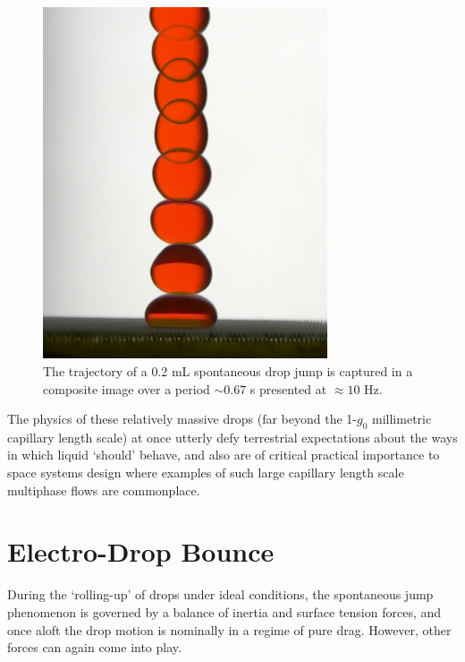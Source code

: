 \documentclass[12pt,a4paper,oneside]{book}
\begin{document}
\begin{figure}[htb]
\centering
\includegraphics[width=0.75\textwidth]{drop_jump}
\caption{The trajectory of a 0.2 mL spontaneous drop jump is captured in a composite image over a period $\sim 0.67$ s presented at $\approx 10$ Hz. \label{fig:nobounce}}
\end{figure}

The physics of these relatively massive drops (far beyond the 1-$g_0$ millimetric capillary length scale) at once utterly defy terrestrial expectations about the ways in which liquid `should' behave, and also are of critical practical importance to space systems design where examples of such large capillary length scale multiphase flows are commonplace.

\section{Electro-Drop Bounce}
During the `rolling-up' of drops under ideal conditions, the spontaneous jump phenomenon is governed by a balance of inertia and surface tension forces, and once aloft the drop motion is nominally in a regime of pure drag. However, other forces can again come into play. 
\end{document}
